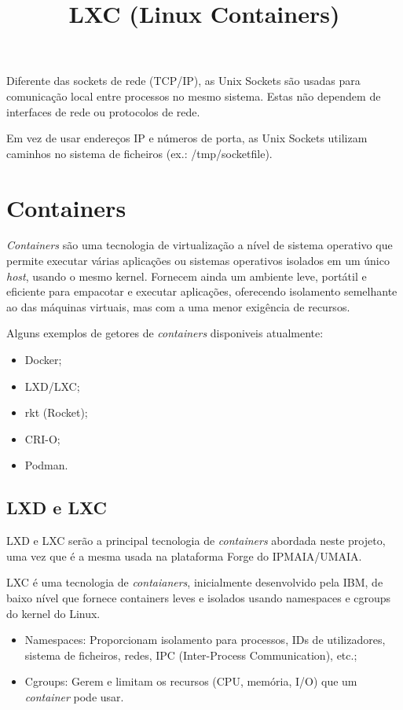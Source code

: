 Diferente das sockets de rede (TCP/IP), as Unix Sockets são usadas para 
comunicação local entre processos no mesmo sistema. Estas não dependem de interfaces 
de rede ou protocolos de rede.

Em vez de usar endereços IP e números de porta, as Unix Sockets utilizam caminhos 
no sistema de ficheiros (ex.: /tmp/socketfile). \\

\section{Containers}

\textit{Containers} são uma tecnologia de virtualização a nível de sistema operativo que 
permite executar várias aplicações ou sistemas operativos isolados em um único \textit{host}, usando o mesmo kernel. 
Fornecem ainda um ambiente leve, portátil e eficiente para empacotar e executar aplicações,
oferecendo isolamento semelhante ao das máquinas virtuais, mas com a uma menor
exigência de recursos.

Alguns exemplos de getores de \textit{containers} disponiveis atualmente:
\begin{itemize}
    \item Docker;
    \item LXD/LXC;
    \item rkt (Rocket);
    \item CRI-O;
    \item Podman.
\end{itemize}



\subsection{LXD e LXC}

LXD e LXC serão a principal tecnologia de \textit{containers} abordada neste projeto,
uma vez que é a mesma usada na plataforma Forge do IPMAIA/UMAIA. \\



\title*{\textbf{LXC (Linux Containers)}}

LXC é uma tecnologia de \textit{contaianers}, inicialmente desenvolvido pela IBM, 
de baixo nível que fornece containers leves e isolados usando namespaces e cgroups 
do kernel do Linux. \\

\begin{itemize}
    \item Namespaces: Proporcionam isolamento para processos, IDs de utilizadores, 
    sistema de ficheiros, redes, IPC (Inter-Process Communication), etc.;
    \item Cgroups: Gerem e limitam os recursos (CPU, memória, I/O) que um
    \textit{container} pode usar.
\end{itemize}



